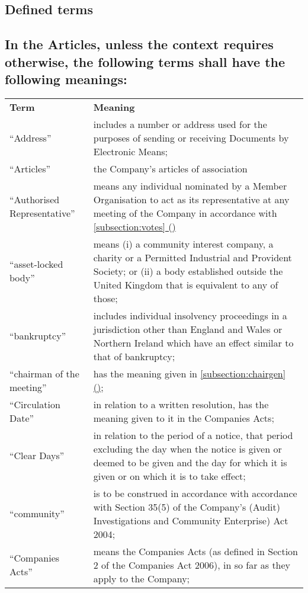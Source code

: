 \documentclass[12pt]{article}
\newcommand*{\fancyref}[1]{\hyperref[{#1}]{\autoref*{#1} (\nameref*{#1})}}
\begin{document}
\subsection*{Defined terms}
\subsection{\mdseries\normalsize{In the Articles, unless the context requires otherwise, the following terms shall have the following meanings:}}

\begin{longtable}[p]{ p{1.5in} p{30em} }
{\bfseries{Term}} & {\bfseries{Meaning}} \\
  ``Address'' & includes a number or address used for the purposes of sending or receiving Documents by Electronic Means; \\
  ``Articles'' & the Company's articles of association \\
  ``Authorised Representative'' & means any individual nominated by a Member Organisation to act as its representative at any meeting of the Company in accordance with \fancyref{subsection:votes} \\
  ``asset-locked body'' & means (i) a community interest company, a charity  or a Permitted Industrial and Provident Society; or (ii) a body established outside the United Kingdom that is equivalent to any of those; \\
  ``bankruptcy'' & includes individual insolvency proceedings in a jurisdiction other than England and Wales or Northern Ireland which have an effect similar to that of bankruptcy; \\
  ``chairman of the meeting'' & has the meaning given in \fancyref{subsection:chairgen}; \\
  ``Circulation Date'' & in relation to a written resolution, has the meaning given to it in the Companies Acts; \\
  ``Clear Days'' & in relation to the period of a notice, that period excluding the day when the notice is given or deemed to be given and the day for which it is given or on which it is to take effect; \\
  ``community'' & is to be construed in accordance with accordance with Section 35(5) of the Company’s (Audit) Investigations and Community Enterprise) Act 2004; \\
  ``Companies Acts'' & means the Companies Acts (as defined in Section 2 of the Companies Act 2006), in so far as they apply to the Company; \\

\end{longtable}
\end{document}
